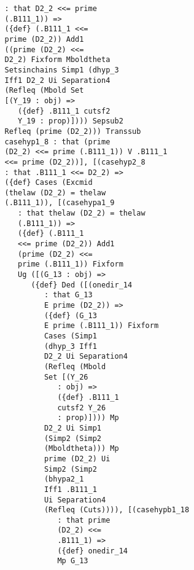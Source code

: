 \documentclass[12pt]{article}
\begin{document}
\begin{verbatim}
                      : that D2_2 <<= prime 
                      (.B111_1)) => 
                      ({def} (.B111_1 <<= 
                      prime (D2_2)) Add1 
                      ((prime (D2_2) <<= 
                      D2_2) Fixform Mboldtheta 
                      Setsinchains Simp1 (dhyp_3 
                      Iff1 D2_2 Ui Separation4 
                      (Refleq (Mbold Set 
                      [(Y_19 : obj) => 
                         ({def} .B111_1 cutsf2 
                         Y_19 : prop)]))) Sepsub2 
                      Refleq (prime (D2_2))) Transsub 
                      casehyp1_8 : that (prime 
                      (D2_2) <<= prime (.B111_1)) V .B111_1 
                      <<= prime (D2_2))], [(casehyp2_8 
                      : that .B111_1 <<= D2_2) => 
                      ({def} Cases (Excmid 
                      (thelaw (D2_2) = thelaw 
                      (.B111_1)), [(casehypa1_9 
                         : that thelaw (D2_2) = thelaw 
                         (.B111_1)) => 
                         ({def} (.B111_1 
                         <<= prime (D2_2)) Add1 
                         (prime (D2_2) <<= 
                         prime (.B111_1)) Fixform 
                         Ug ([(G_13 : obj) => 
                            ({def} Ded ([(onedir_14 
                               : that G_13 
                               E prime (D2_2)) => 
                               ({def} (G_13 
                               E prime (.B111_1)) Fixform 
                               Cases (Simp1 
                               (dhyp_3 Iff1 
                               D2_2 Ui Separation4 
                               (Refleq (Mbold 
                               Set [(Y_26 
                                  : obj) => 
                                  ({def} .B111_1 
                                  cutsf2 Y_26 
                                  : prop)]))) Mp 
                               D2_2 Ui Simp1 
                               (Simp2 (Simp2 
                               (Mboldtheta))) Mp 
                               prime (D2_2) Ui 
                               Simp2 (Simp2 
                               (bhypa2_1 
                               Iff1 .B111_1 
                               Ui Separation4 
                               (Refleq (Cuts)))), [(casehypb1_18 
                                  : that prime 
                                  (D2_2) <<= 
                                  .B111_1) => 
                                  ({def} onedir_14 
                                  Mp G_13 

\end{verbatim}
\end{document}
